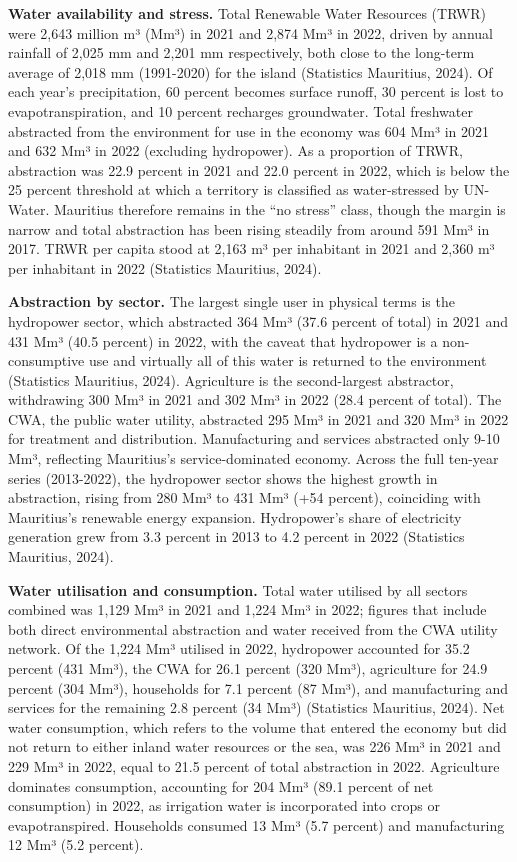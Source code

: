 \documentclass[
  letterpaper,
  DIV=11,
  numbers=noendperiod]{scrartcl}
\begin{document}
\textbf{Water availability and stress.} Total Renewable Water Resources
(TRWR) were 2,643 million m³ (Mm³) in 2021 and 2,874 Mm³ in 2022, driven
by annual rainfall of 2,025 mm and 2,201 mm respectively, both close to
the long-term average of 2,018 mm (1991-2020) for the island (Statistics
Mauritius, 2024). Of each year's precipitation, 60 percent becomes
surface runoff, 30 percent is lost to evapotranspiration, and 10 percent
recharges groundwater. Total freshwater abstracted from the environment
for use in the economy was 604 Mm³ in 2021 and 632 Mm³ in 2022
(excluding hydropower). As a proportion of TRWR, abstraction was 22.9
percent in 2021 and 22.0 percent in 2022, which is below the 25 percent
threshold at which a territory is classified as water-stressed by
UN-Water. Mauritius therefore remains in the ``no stress'' class, though
the margin is narrow and total abstraction has been rising steadily from
around 591 Mm³ in 2017. TRWR per capita stood at 2,163 m³ per inhabitant
in 2021 and 2,360 m³ per inhabitant in 2022 (Statistics Mauritius,
2024).

\textbf{Abstraction by sector.} The largest single user in physical
terms is the hydropower sector, which abstracted 364 Mm³ (37.6 percent
of total) in 2021 and 431 Mm³ (40.5 percent) in 2022, with the caveat
that hydropower is a non-consumptive use and virtually all of this water
is returned to the environment (Statistics Mauritius, 2024). Agriculture
is the second-largest abstractor, withdrawing 300 Mm³ in 2021 and 302
Mm³ in 2022 (28.4 percent of total). The CWA, the public water utility,
abstracted 295 Mm³ in 2021 and 320 Mm³ in 2022 for treatment and
distribution. Manufacturing and services abstracted only 9-10 Mm³,
reflecting Mauritius's service-dominated economy. Across the full
ten-year series (2013-2022), the hydropower sector shows the highest
growth in abstraction, rising from 280 Mm³ to 431 Mm³ (+54 percent),
coinciding with Mauritius's renewable energy expansion. Hydropower's
share of electricity generation grew from 3.3 percent in 2013 to 4.2
percent in 2022 (Statistics Mauritius, 2024).

\textbf{Water utilisation and consumption.} Total water utilised by all
sectors combined was 1,129 Mm³ in 2021 and 1,224 Mm³ in 2022; figures
that include both direct environmental abstraction and water received
from the CWA utility network. Of the 1,224 Mm³ utilised in 2022,
hydropower accounted for 35.2 percent (431 Mm³), the CWA for 26.1
percent (320 Mm³), agriculture for 24.9 percent (304 Mm³), households
for 7.1 percent (87 Mm³), and manufacturing and services for the
remaining 2.8 percent (34 Mm³) (Statistics Mauritius, 2024). Net water
consumption, which refers to the volume that entered the economy but did
not return to either inland water resources or the sea, was 226 Mm³ in
2021 and 229 Mm³ in 2022, equal to 21.5 percent of total abstraction in
2022. Agriculture dominates consumption, accounting for 204 Mm³ (89.1
percent of net consumption) in 2022, as irrigation water is incorporated
into crops or evapotranspired. Households consumed 13 Mm³ (5.7 percent)
and manufacturing 12 Mm³ (5.2 percent).
\end{document}
